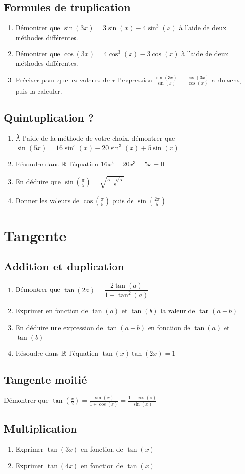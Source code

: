 \documentclass[oneside,12pt]{book}          %
\begin{document}
\subsection{Formules de truplication}
\begin{enumerate}
	\item Démontrer que $\sin(3x)=3\sin(x)-4\sin^3(x)$ à l'aide de deux méthodes différentes.
	\item Démontrer que $\cos(3x)=4\cos^3(x)-3\cos(x)$ à l'aide de deux méthodes différentes.
	\item Préciser pour quelles valeurs de $x$ l'expression $\frac{\sin(3x)}{\sin(x)}-\frac{\cos(3x)}{\cos(x)}$ a du sens, puis la calculer.
\end{enumerate}



\subsection{Quintuplication ?}
\begin{enumerate}
	\item À l'aide de la méthode de votre choix, démontrer que $\sin(5x)=16\sin^5(x)-20\sin^3(x)+5\sin(x)$
	\item Résoudre dans ${\mathbb R}$ l'équation $16x^5-20x^3+5x=0$
	\item En déduire que $\sin\left(\frac{\pi}{5}\right)=\sqrt{\frac{5-\sqrt{5}}{8}}$
	\item Donner les valeurs de $\cos\left(\frac{\pi}{5}\right)$ puis de $\sin\left(\frac{2\pi}{5}\right)$
\end{enumerate}



\section{Tangente}

\subsection{Addition et duplication}
\begin{enumerate}
	\item Démontrer que $\tan(2a)=\dfrac{2\tan(a)}{1-\tan^2(a)}$
	\item Exprimer en fonction de $\tan(a)$ et $\tan(b)$ la valeur de $\tan(a+b)$
	\item En déduire une expression de $\tan(a-b)$ en fonction de $\tan(a)$ et $\tan(b)$
	\item Résoudre dans ${\mathbb R}$ l'équation $\tan(x)\tan(2x)=1$
\end{enumerate}



\subsection{Tangente moitié}

Démontrer que $\tan\left(\frac{x}{2}\right)=\frac{\sin(x)}{1+\cos(x)}=\frac{1-\cos(x)}{\sin(x)}$



\subsection{Multiplication}
\begin{enumerate}
	\item Exprimer $\tan(3x)$ en fonction de $\tan(x)$
	\item Exprimer $\tan(4x)$ en fonction de $\tan(x)$
\end{enumerate}
\end{document}

